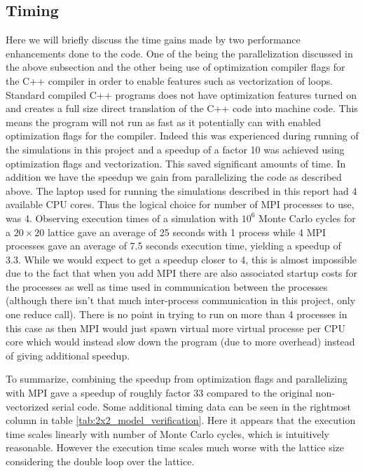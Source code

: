 \documentclass[12pt]{article}
\numberwithin{figure}{section}
\numberwithin{table}{section}
\begin{document}
\subsection{Timing}
Here we will briefly discuss the time gains made by two performance enhancements done to the code. One of the being the parallelization discussed in the above subsection and the other being use of optimization compiler flags for the C++ compiler in order to enable features such as vectorization of loops. Standard compiled C++ programs does not have optimization features turned on and creates a full size direct translation of the C++ code into machine code. This means the program will not run as fast as it potentially can with enabled optimization flags for the compiler. Indeed this was experienced during running of the simulations in this project and a speedup of a factor 10 was achieved using optimization flags and vectorization. This saved significant amounts of time. In addition we have the speedup we gain from parallelizing the code as described above. The laptop used for running the simulations described in this report had 4 available CPU cores. Thus the logical choice for number of MPI processes to use, was 4. Observing execution times of a simulation with $10^6$ Monte Carlo cycles for a $20\times20$ lattice gave an average of 25 seconds with 1 process while 4 MPI processes gave an average of 7.5 seconds execution time, yielding a speedup of 3.3. While we would expect to get a speedup closer to 4, this is almost impossible due to the fact that when you add MPI there are also associated startup costs for the processes as well as time used in communication between the processes (although there isn't that much inter-process communication in this project, only one reduce call). There is no point in trying to run on more than 4 processes in this case as then MPI would just spawn virtual more virtual processe per CPU core which would instead slow down the program (due to more overhead) instead of giving additional speedup.
\vspace{0.30cm}

\noindent To summarize, combining the speedup from optimization flags and parallelizing with MPI gave a speedup of roughly factor 33 compared to the original non-vectorized serial code. Some additional timing data can be seen in the rightmost column in table \ref{tab:2x2_model_verification}. Here it appears that the execution time scales  linearly with number of Monte Carlo cycles, which is intuitively reasonable. However the execution time scales much worse with the lattice size considering the double loop over the lattice.
\end{document}
